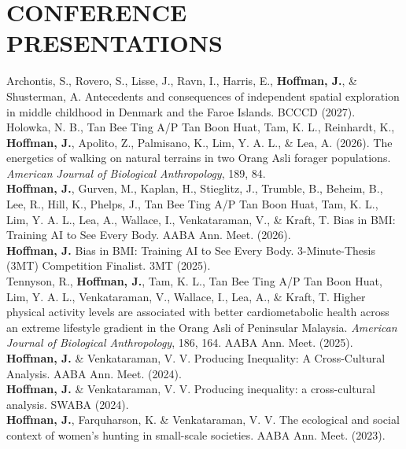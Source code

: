 \documentclass[a4paper,9pt]{extarticle}
\begin{document}
\section*{CONFERENCE PRESENTATIONS}
    \noindent Archontis, S., Rovero, S., Lisse, J., Ravn, I., Harris, E., \textbf{Hoffman, J.}, \& Shusterman, A. Antecedents and consequences of independent spatial exploration in middle childhood in Denmark and the Faroe Islands. BCCCD (2027).\\[5pt]
    \noindent Holowka, N. B., Tan Bee Ting A/P Tan Boon Huat, Tam, K. L., Reinhardt, K., \textbf{Hoffman, J.}, Apolito, Z., Palmisano, K., Lim, Y. A. L., \& Lea, A. (2026). The energetics of walking on natural terrains in two Orang Asli forager populations. \textit{American Journal of Biological Anthropology}, 189, 84.\\[5pt]
    \noindent \textbf{Hoffman, J.}, Gurven, M., Kaplan, H., Stieglitz, J., Trumble, B., Beheim, B., Lee, R., Hill, K., Phelps, J., Tan Bee Ting A/P Tan Boon Huat, Tam, K. L., Lim, Y. A. L., Lea, A., Wallace, I., Venkataraman, V., \& Kraft, T. Bias in BMI: Training AI to See Every Body. AABA Ann. Meet. (2026).\\[5pt]
    \noindent \textbf{Hoffman, J.} Bias in BMI: Training AI to See Every Body. 3-Minute-Thesis (3MT) Competition Finalist. 3MT (2025).\\[5pt]
    \noindent Tennyson, R., \textbf{Hoffman, J.}, Tam, K. L., Tan Bee Ting A/P Tan Boon Huat, Lim, Y. A. L., Venkataraman, V., Wallace, I., Lea, A., \& Kraft, T. Higher physical activity levels are associated with better cardiometabolic health across an extreme lifestyle gradient in the Orang Asli of Peninsular Malaysia. \textit{American Journal of Biological Anthropology}, 186, 164. AABA Ann. Meet. (2025).\\[5pt]
    \noindent \textbf{Hoffman, J.} \& Venkataraman, V. V. Producing Inequality: A Cross-Cultural Analysis. AABA Ann. Meet. (2024).\\[5pt]
    \noindent \textbf{Hoffman, J.} \& Venkataraman, V. V. Producing inequality: a cross-cultural analysis. SWABA (2024).\\[5pt]
    \noindent \textbf{Hoffman, J.}, Farquharson, K. \& Venkataraman, V. V. The ecological and social context of women's hunting in small-scale societies. AABA Ann. Meet. (2023).
\end{document}
